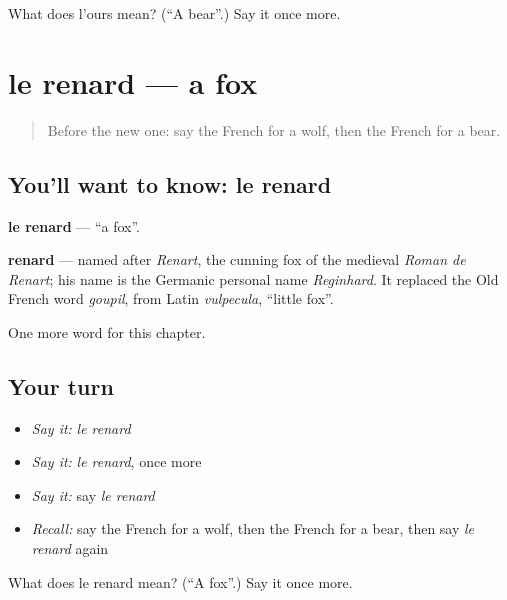 \begin{tcolorbox}[breakable,colback=teal!4,colframe=teal!35!black,title={Before you move on}]
What does l'ours mean? (\textquotedblleft{}A bear\textquotedblright{}.) Say it once more.
\end{tcolorbox}
\section[le renard]{le renard — a fox}

\label{lesson:FR-C86-renard}



\begin{quote}
Before the new one: say the French for a wolf, then the French for a bear.
\end{quote}

\subsection*{You'll want to know: le renard}
\textbf{le renard} — \textquotedblleft{}a fox\textquotedblright{}.

\begin{cousinweb}
\textbf{renard} — named after \emph{Renart}, the cunning fox of the medieval \emph{Roman de Renart}; his name is the Germanic personal name \emph{Reginhard}. It replaced the Old French word \emph{goupil}, from Latin \emph{vulpecula}, \textquotedblleft{}little fox\textquotedblright{}.
\end{cousinweb}

\begin{grammarlens}[title={What you've built}]
One more word for this chapter.
\end{grammarlens}

\subsection*{Your turn}
\begin{itemize}
\raggedright
  \item \emph{Say it:} \emph{le renard}
  \item \emph{Say it:} \emph{le renard}, once more
  \item \emph{Say it:} say \emph{le renard}
  \item \emph{Recall:} say the French for a wolf, then the French for a bear, then say \emph{le renard} again
\end{itemize}

\begin{tcolorbox}[breakable,colback=teal!4,colframe=teal!35!black,title={Before you move on}]
What does le renard mean? (\textquotedblleft{}A fox\textquotedblright{}.) Say it once more.
\end{tcolorbox}
